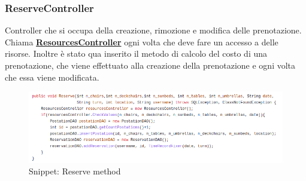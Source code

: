 \documentclass{article}
\begin{document}
{\subsubsection{ReserveController}\label{subsubsec:reservecontroller}
Controller che si occupa della creazione, rimozione e modifica delle prenotazione. Chiama \hyperref[subsubsec:resourcescontroller]{\textbf{ResourcesController}} ogni volta che deve fare un accesso a delle risorse. Inoltre è stato qua inserito il metodo di calcolo del costo di una prenotazione, che viene effettuato alla creazione della prenotazione e ogni volta che essa viene modificata. 
\begin{figure}[H]
                \centering
                \includegraphics[width=\textwidth]{Images/Snippets/Reserve.png}
                \caption{Snippet: Reserve method}
                \label{fig:reserve}
            \end{figure}
}
\end{document}
